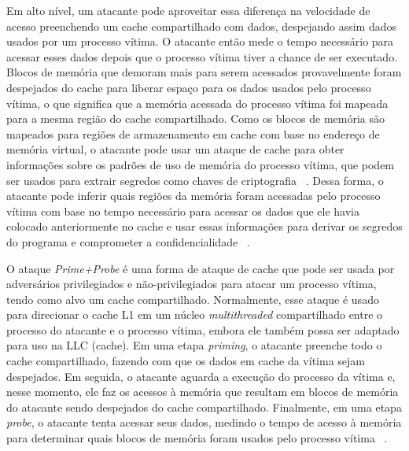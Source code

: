 \documentclass[review]{elsarticle}
\begin{document}
Em alto nível, um atacante pode aproveitar essa diferença na velocidade de acesso preenchendo um cache compartilhado com dados, despejando assim dados usados por um processo vítima. O atacante então mede o tempo necessário para acessar esses dados depois que o processo vítima tiver a chance de ser executado. Blocos de memória que demoram mais para serem acessados provavelmente foram despejados do cache para liberar espaço para os dados usados pelo processo vítima, o que significa que a memória acessada do processo vítima foi mapeada para a mesma região do cache compartilhado. Como os blocos de memória são mapeados para regiões de armazenamento em cache com base no endereço de memória virtual, o atacante pode usar um ataque de cache para obter informações sobre os padrões de uso de memória do processo vítima, que podem ser usados para extrair segredos como chaves de criptografia ~\cite{liu_cache-timing_2013}. Dessa forma, o atacante pode inferir quais regiões da memória foram acessadas pelo processo vítima com base no tempo necessário para acessar os dados que ele havia colocado anteriormente no cache e usar essas informações para derivar os segredos do programa e comprometer a confidencialidade ~\cite{moghimi_cachezoom:_2017, gotzfried_cache_2017}.

O ataque \emph{Prime+Probe} é uma forma de ataque de cache que pode ser usada por adversários privilegiados e não-privilegiados para atacar um processo vítima, tendo como alvo um cache compartilhado. Normalmente, esse ataque é usado para direcionar o cache L1 em um núcleo \emph{multithreaded} compartilhado entre o processo do atacante e o processo vítima, embora ele também possa ser adaptado para uso na LLC (cache). Em uma etapa \emph{priming}, o atacante preenche todo o cache compartilhado, fazendo com que os dados em cache da vítima sejam despejados. Em seguida, o atacante aguarda a execução do processo da vítima e, nesse momento, ele faz os acessos à memória que resultam em blocos de memória do atacante sendo despejados do cache compartilhado. Finalmente, em uma etapa \emph{probe}, o atacante tenta acessar seus dados, medindo o tempo de acesso à memória para determinar quais blocos de memória foram usados pelo processo vítima ~\cite{moghimi_cachezoom:_2017, gotzfried_cache_2017}.
\end{document}
